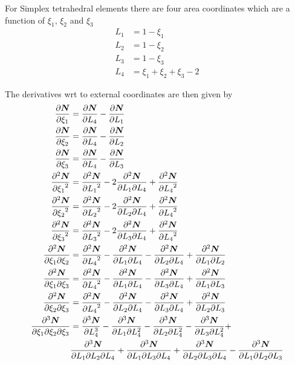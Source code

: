 For Simplex tetrahedral elements there are four area coordinates which are a
function of $\xi_{1}$, $\xi_{2}$ and $\xi_{3}$ \ie
\begin{align}
  L_{1} &= 1 - \xi_{1} \\
  L_{2} &= 1 - \xi_{2} \\
  L_{3} &= 1 - \xi_{3} \\
  L_{4} &= \xi_{1} + \xi_{2} + \xi_{3} - 2
\end{align}

The derivatives wrt to external coordinates are then given by
\begin{align}
  \delby{\vect{\sbfnsymb{}}}{\xi_{1}} &= \delby{\vect{\sbfnsymb{}}}{L_{4}}-\delby{\vect{\sbfnsymb{}}}{L_{1}} \\
  \delby{\vect{\sbfnsymb{}}}{\xi_{2}} &= \delby{\vect{\sbfnsymb{}}}{L_{4}}-\delby{\vect{\sbfnsymb{}}}{L_{2}} \\
  \delby{\vect{\sbfnsymb{}}}{\xi_{3}} &= \delby{\vect{\sbfnsymb{}}}{L_{4}}-\delby{\vect{\sbfnsymb{}}}{L_{3}} \\
  \deltwosqby{\vect{\sbfnsymb{}}}{\xi_{1}} &= \deltwosqby{\vect{\sbfnsymb{}}}{L_{1}}-
  2\deltwoby{\vect{\sbfnsymb{}}}{L_{1}}{L_{4}}+\deltwosqby{\vect{\sbfnsymb{}}}{L_{4}} \\
  \deltwosqby{\vect{\sbfnsymb{}}}{\xi_{2}} &= \deltwosqby{\vect{\sbfnsymb{}}}{L_{2}}-
  2\deltwoby{\vect{\sbfnsymb{}}}{L_{2}}{L_{4}}+\deltwosqby{\vect{\sbfnsymb{}}}{L_{4}} \\
  \deltwosqby{\vect{\sbfnsymb{}}}{\xi_{3}} &= \deltwosqby{\vect{\sbfnsymb{}}}{L_{3}}-
  2\deltwoby{\vect{\sbfnsymb{}}}{L_{3}}{L_{4}}+\deltwosqby{\vect{\sbfnsymb{}}}{L_{4}} \\  
  \deltwoby{\vect{\sbfnsymb{}}}{\xi_{1}}{\xi_{2}} &= \deltwosqby{\vect{\sbfnsymb{}}}{L_{4}}-
  \deltwoby{\vect{\sbfnsymb{}}}{L_{1}}{L_{4}}-\deltwoby{\vect{\sbfnsymb{}}}{L_{2}}{L_{4}}+
  \deltwoby{\vect{\sbfnsymb{}}}{L_{1}}{L_{2}} \\
  \deltwoby{\vect{\sbfnsymb{}}}{\xi_{1}}{\xi_{3}} &= \deltwosqby{\vect{\sbfnsymb{}}}{L_{4}}-
  \deltwoby{\vect{\sbfnsymb{}}}{L_{1}}{L_{4}}-\deltwoby{\vect{\sbfnsymb{}}}{L_{3}}{L_{4}}+
  \deltwoby{\vect{\sbfnsymb{}}}{L_{1}}{L_{3}} \\
  \deltwoby{\vect{\sbfnsymb{}}}{\xi_{2}}{\xi_{3}} &= \deltwosqby{\vect{\sbfnsymb{}}}{L_{4}}-
  \deltwoby{\vect{\sbfnsymb{}}}{L_{2}}{L_{4}}-\deltwoby{\vect{\sbfnsymb{}}}{L_{3}}{L_{4}}+
  \deltwoby{\vect{\sbfnsymb{}}}{L_{2}}{L_{3}} \\
  \delthreeby{\vect{\sbfnsymb{}}}{\xi_{1}}{\xi_{2}}{\xi_{3}} &= \delthreecuby{\vect{\sbfnsymb{}}}{L_{4}}-
  \deldeltwoby{\vect{\sbfnsymb{}}}{L_{1}}{L_{4}}-\deldeltwoby{\vect{\sbfnsymb{}}}{L_{2}}{L_{4}}-
  \deldeltwoby{\vect{\sbfnsymb{}}}{L_{3}}{L_{4}}+ \\
  &\delthreeby{\vect{\sbfnsymb{}}}{L_{1}}{L_{2}}{L_{4}}+\delthreeby{\vect{\sbfnsymb{}}}{L_{1}}{L_{3}}{L_{4}}+
  \delthreeby{\vect{\sbfnsymb{}}}{L_{2}}{L_{3}}{L_{4}}-\delthreeby{\vect{\sbfnsymb{}}}{L_{1}}{L_{2}}{L_{3}}
\end{align}

